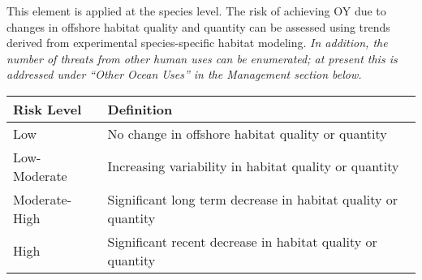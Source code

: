 \documentclass[11pt,]{article}
\begin{document}
This element is applied at the species level. The risk of achieving OY
due to changes in offshore habitat quality and quantity can be assessed
using trends derived from experimental species-specific habitat
modeling. \emph{In addition, the number of threats from other human uses
can be enumerated; at present this is addressed under ``Other Ocean
Uses'' in the Management section below.}

\begin{longtable}[]{@{}ll@{}}
\toprule
\begin{minipage}[b]{0.22\columnwidth}\raggedright\strut
Risk Level\strut
\end{minipage} & \begin{minipage}[b]{0.72\columnwidth}\raggedright\strut
Definition\strut
\end{minipage}\tabularnewline
\midrule
\endhead
\begin{minipage}[t]{0.22\columnwidth}\raggedright\strut
Low\strut
\end{minipage} & \begin{minipage}[t]{0.72\columnwidth}\raggedright\strut
No change in offshore habitat quality or quantity\strut
\end{minipage}\tabularnewline
\begin{minipage}[t]{0.22\columnwidth}\raggedright\strut
Low-Moderate\strut
\end{minipage} & \begin{minipage}[t]{0.72\columnwidth}\raggedright\strut
Increasing variability in habitat quality or quantity\strut
\end{minipage}\tabularnewline
\begin{minipage}[t]{0.22\columnwidth}\raggedright\strut
Moderate-High\strut
\end{minipage} & \begin{minipage}[t]{0.72\columnwidth}\raggedright\strut
Significant long term decrease in habitat quality or quantity\strut
\end{minipage}\tabularnewline
\begin{minipage}[t]{0.22\columnwidth}\raggedright\strut
High\strut
\end{minipage} & \begin{minipage}[t]{0.72\columnwidth}\raggedright\strut
Significant recent decrease in habitat quality or quantity\strut
\end{minipage}\tabularnewline
\bottomrule
\end{longtable}
\end{document}
